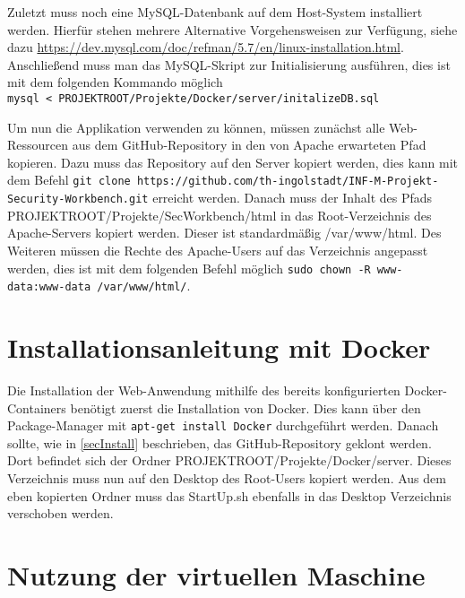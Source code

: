 Zuletzt muss noch eine MySQL-Datenbank auf dem Host-System installiert werden. Hierfür stehen mehrere Alternative Vorgehensweisen zur Verfügung, siehe dazu \url{https://dev.mysql.com/doc/refman/5.7/en/linux-installation.html}. Anschließend muss man das MySQL-Skript zur Initialisierung ausführen, dies ist mit dem folgenden Kommando möglich\\ \colorbox{altgray}{\lstinline|mysql < PROJEKTROOT/Projekte/Docker/server/initalizeDB.sql|} \medskip

Um nun die Applikation verwenden zu können, müssen zunächst alle Web-Ressourcen aus dem GitHub-Repository in den von Apache erwarteten Pfad kopieren. Dazu muss das Repository auf den Server kopiert werden, dies kann mit dem Befehl \colorbox{altgray}{\lstinline|git clone https://github.com/th-ingolstadt/INF-M-Projekt-Security-Workbench.git|} erreicht werden. Danach muss der Inhalt des Pfads PROJEKTROOT/Projekte/SecWorkbench/html in das Root-Verzeichnis des Apache-Servers kopiert werden. Dieser ist standardmäßig /var/www/html. Des Weiteren müssen die Rechte des Apache-Users auf das Verzeichnis angepasst werden, dies ist mit dem folgenden Befehl möglich \colorbox{altgray}{\lstinline|sudo chown -R www-data:www-data /var/www/html/|}.

\section{Installationsanleitung mit Docker}

Die Installation der Web-Anwendung mithilfe des bereits konfigurierten Docker-Containers benötigt zuerst die Installation von Docker. Dies kann über den Package-Manager mit \colorbox{altgray}{\lstinline|apt-get install Docker|} durchgeführt werden. Danach sollte, wie in \ref{secInstall} beschrieben, das GitHub-Repository geklont werden. Dort befindet sich der Ordner PROJEKTROOT/Projekte/Docker/server. Dieses Verzeichnis muss nun auf den Desktop des Root-Users kopiert werden. Aus dem eben kopierten Ordner muss das StartUp.sh ebenfalls in das Desktop Verzeichnis verschoben werden. 

\section{Nutzung der virtuellen Maschine}


